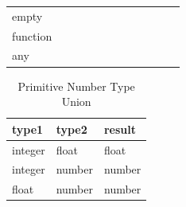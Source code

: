 \begin{table}[!h]
\begin{tabular}{ m{1.1cm} m{0.95cm} m{0.95cm} m{0.95cm} m{0.95cm} m{0.95cm} m{0.95cm} m{0.95cm} m{0.95cm} m{0.95cm} m{0.95cm} m{0.95cm}}
\multicolumn{1}{l|}{empty}    & \multicolumn{1}{l|}{\cellcolor[HTML]{036400}} & \multicolumn{1}{l|}{}                                                & \multicolumn{1}{l|}{}                         & \multicolumn{1}{l|}{}                         & \multicolumn{1}{l|}{}                         & \multicolumn{1}{l|}{}                         & \multicolumn{1}{l|}{}                         & \multicolumn{1}{l|}{}                         & \multicolumn{1}{l|}{\cellcolor[HTML]{036400}} & \multicolumn{1}{l|}{}                         & \multicolumn{1}{l|}{} \\ \cline{2-12} 
\multicolumn{1}{l|}{function} & \multicolumn{1}{l|}{\cellcolor[HTML]{036400}} & \multicolumn{1}{l|}{}                                                & \multicolumn{1}{l|}{}                         & \multicolumn{1}{l|}{}                         & \multicolumn{1}{l|}{}                         & \multicolumn{1}{l|}{}                         & \multicolumn{1}{l|}{}                         & \multicolumn{1}{l|}{}                         & \multicolumn{1}{l|}{}                         & \multicolumn{1}{l|}{\cellcolor[HTML]{036400}} & \multicolumn{1}{l|}{} \\ \cline{2-12} 
\multicolumn{1}{l|}{any}      & \multicolumn{1}{l|}{}                         & \multicolumn{1}{l|}{}                                                & \multicolumn{1}{l|}{}                         & \multicolumn{1}{l|}{}                         & \multicolumn{1}{l|}{}                         & \multicolumn{1}{l|}{}                         & \multicolumn{1}{l|}{}                         & \multicolumn{1}{l|}{}                         & \multicolumn{1}{l|}{}                         & \multicolumn{1}{l|}{}                         & \multicolumn{1}{l|}{} \\ \cline{2-12} 
\end{tabular}
     \label{tab:comp}
    \end{table}
\clearpage
\begin{table}[!h]
\caption{Primitive Number Type Union}
\begin{center}
    \begin{tabular}{lll}
        type1                        & type2  & result                      \\ \hline
        \multicolumn{1}{|l}{integer} & float  & \multicolumn{1}{l|}{float} \\ \hline
        \multicolumn{1}{|l}{integer} & number & \multicolumn{1}{l|}{number} \\ \hline
        \multicolumn{1}{|l}{float}   & number & \multicolumn{1}{l|}{number} \\ \hline
        \end{tabular}
\end{center}
 \label{tab:res}
\end{table}
